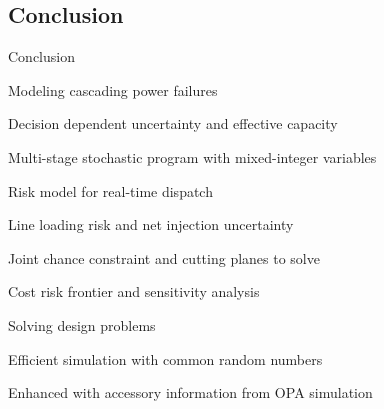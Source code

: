 \subsection{Conclusion}
\begin{frame}{Conclusion}
\bi
\item Modeling cascading power failures
\bi
\item Decision dependent uncertainty and effective capacity
\item Multi-stage stochastic program with mixed-integer variables
\ei
\item Risk model for real-time dispatch
\bi
\item Line loading risk and net injection uncertainty
\item Joint chance constraint and cutting planes to solve
\item Cost risk frontier and sensitivity analysis
\ei
\item Solving design problems
\bi
\item Efficient simulation with common random numbers
\item Enhanced with accessory information from OPA simulation
\ei
\ei
\end{frame}


